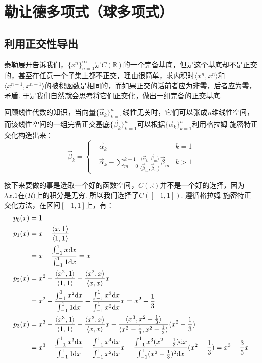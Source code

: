 \documentclass[UTF8]{ctexart}
\newcommand{\trm}[1]{{\rm #1}}
\newenvironment{reference}
    {\begin{tcolorbox}[enhanced, colback=GhostWhite, breakable=true, frame hidden, borderline west={1.5mm}{-2mm}{Gray}]}
    {\end{tcolorbox}}
\begin{document}
\section{勒让德多项式（球多项式）}

\subsection{利用正交性导出}

泰勒展开告诉我们，\(\{x^n\}_{n=0}^{\infty}\)是\(C(\mathbb{R})\)的一个完备基底，但是这个基底却不是正交的，甚至在任意一个子集上都不正交，理由很简单，求内积时\(\langle x^n, x^n \rangle\)和\(\langle x^{n-1}, x^{n+1} \rangle\)的被积函数是相同的，而如果正交的话前者应为非零，后者应为零，矛盾. 于是我们自然就会思考将它们正交化，做出一组完备的正交基底.
\begin{reference}
    回顾线性代数的知识，当向量\(\{\vec{\alpha}_k\}_{k=1}^{n}\)线性无关时，它们可以张成\(n\)维线性空间，而该线性空间的一组完备正交基底\(\{\vec{\beta}_k\}_{k=1}^{n}\)可以根据\(\{\vec{\alpha}_k\}_{k=1}^{n}\)利用格拉姆-施密特正交化构造出来：
    \[
        \vec{\beta}_k = 
        \left\{
            \begin{aligned}
                & \vec{\alpha}_k & k=1 \\
                & \vec{\alpha}_k - \sum_{m=0}^{k-1}\frac{\langle \vec{\alpha}_k, \vec{\beta}_m \rangle}{\langle \vec{\beta}_m, \vec{\beta}_m \rangle}\vec{\beta}_{m} & k > 1
            \end{aligned}
        \right.
    \]
\end{reference}

接下来要做的事是选取一个好的函数空间，\(C(\mathbb{R})\)并不是一个好的选择，因为\(\lambda x.1\)在\(\mathbb(R)\)上的积分是无穷. 所以我们选择了\(C([-1,1])\). 遵循格拉姆-施密特正交化方法，在区间\([-1,1]\)上，有：
\begin{align*}
    p_0(x) &= 1 \\
    p_1(x) &= x-\frac{\langle x, 1 \rangle}{\langle 1,1 \rangle} \\
    &= x - \frac{\int_{-1}^{1} x \trm{d}x}{\int_{-1}^{1} 1\trm{d}x} = x \\
    p_2(x) &= x^2 - \frac{\langle x^2, 1 \rangle}{\langle 1,1 \rangle} - \frac{\langle x^2, x \rangle}{\langle x,x \rangle}x \\
    &= x^2 - \frac{\int_{-1}^{1} x^2 \trm{d}x}{\int_{-1}^{1} 1\trm{d}x} - \frac{\int_{-1}^{1} x^3 \trm{d}x}{\int_{-1}^{1} x^2 \trm{d}x}x = x^2-\frac{1}{3} \\
    p_3(x) &= x^3 - \frac{\langle x^3, 1 \rangle}{\langle 1,1 \rangle} - \frac{\langle x^3, x \rangle}{\langle x,x \rangle}x - \frac{\langle x^3, x^2-\frac{1}{3} \rangle}{\langle x^2-\frac{1}{3},x^2-\frac{1}{3} \rangle}(x^2-\frac{1}{3}) \\
    &= x^3 - \frac{\int_{-1}^{1} x^3 \trm{d}x}{\int_{-1}^{1} 1\trm{d}x} - \frac{\int_{-1}^{1} x^4 \trm{d}x}{\int_{-1}^{1} x^2 \trm{d}x}x - \frac{\int_{-1}^{1} x^3(x^2-\frac{1}{3}) \trm{d}x}{\int_{-1}^{1} (x^2-\frac{1}{3})^2 \trm{d}x}(x^2-\frac{1}{3}) = x^3 - \frac{3}{5}x
\end{align*}
\end{document}
